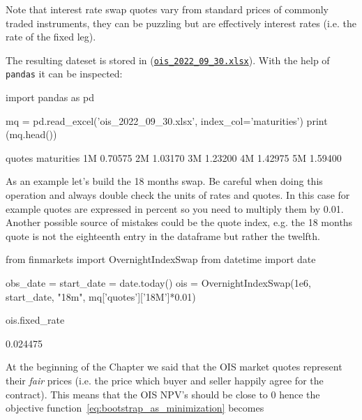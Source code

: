 Note that interest rate swap quotes vary from standard prices of commonly traded instruments, they can be puzzling but are effectively interest rates (i.e. the rate of the fixed leg).

The resulting dateset is stored in (\href{https://github.com/matteosan1/finance_course/raw/master/input_files/ois_2022_09_30.xlsx}{\texttt{ois\_2022\_09\_30.xlsx}}). With the help of \texttt{pandas} it can be inspected:

\begin{ipython}
import pandas as pd

mq = pd.read_excel('ois_2022_09_30.xlsx', index_col='maturities')
print (mq.head())
\end{ipython}
\begin{ioutput}
             quotes
maturities
        1M  0.70575
        2M  1.03170
        3M  1.23200
        4M  1.42975
        5M  1.59400
\end{ioutput}

As an example let's build the 18 months swap. Be careful when doing this operation and always double check the units of rates and quotes. In this case for example quotes are expressed in percent so you need to multiply them by 0.01. Another possible source of mistakes could be the quote index, e.g. the 18 months quote is not the eighteenth entry in the dataframe but rather the twelfth.

\begin{ipython}
from finmarkets import OvernightIndexSwap
from datetime import date

obs_date = start_date = date.today()
ois = OvernightIndexSwap(1e6, start_date, "18m",
                         mq['quotes']['18M']*0.01)
	
ois.fixed_rate
\end{ipython}
\begin{ioutput}
0.024475
\end{ioutput}

At the beginning of the Chapter we said that the OIS market quotes represent their \emph{fair} prices (i.e. the price which buyer and seller happily agree for the contract). This means that the OIS NPV's should be close to 0 hence the objective function~\ref{eq:bootstrap_as_minimization} becomes


